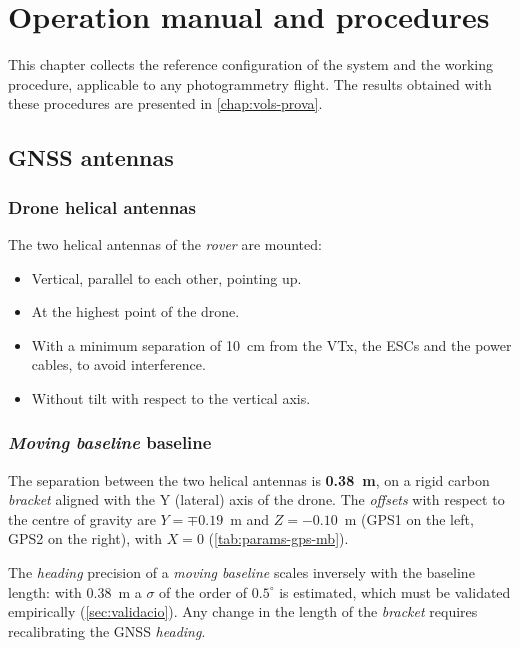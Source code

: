 \chapter{Operation manual and procedures}
\label{chap:manual}

This chapter collects the reference configuration of the system and the working procedure, applicable to any photogrammetry flight. The results obtained with these procedures are presented in \cref{chap:vols-prova}.

\section{GNSS antennas}
\label{sec:antenes-gnss}

\subsection{Drone helical antennas}

The two helical antennas of the \emph{rover} are mounted:
\begin{itemize}
    \item Vertical, parallel to each other, pointing up.
    \item At the highest point of the drone.
    \item With a minimum separation of 10~cm from the VTx, the ESCs and the power cables, to avoid interference.
    \item Without tilt with respect to the vertical axis.
\end{itemize}

\subsection{\emph{Moving baseline} baseline}

The separation between the two helical antennas is \textbf{0.38~m}, on a rigid carbon \emph{bracket} aligned with the Y (lateral) axis of the drone. The \emph{offsets} with respect to the centre of gravity are $Y = \mp 0.19$~m and $Z = -0.10$~m (GPS1 on the left, GPS2 on the right), with $X = 0$ (\cref{tab:params-gps-mb}).

The \emph{heading} precision of a \emph{moving baseline} scales inversely with the baseline length: with 0.38~m a $\sigma$ of the order of $0.5^{\circ}$ is estimated, which must be validated empirically (\cref{sec:validacio}). Any change in the length of the \emph{bracket} requires recalibrating the GNSS \emph{heading}.

